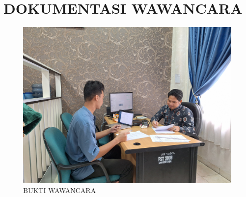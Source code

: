 %
%
%
%


\renewcommand{\thepage}{C - \arabic{page}}
\chapter{DOKUMENTASI WAWANCARA}
\begin{figure}[h]
	\centering
	\includegraphics[width=0.82\linewidth]{konten/gambar/wawancara.jpg}
	\caption{BUKTI WAWANCARA}
	\label{fig:hasil-wawancara}
\end{figure}